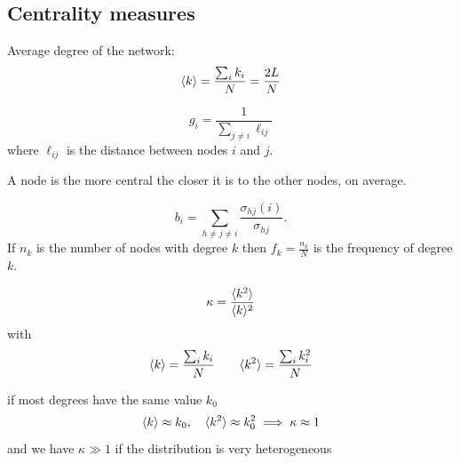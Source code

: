 \documentclass[a4paper,9pt]{extarticle}
\begin{document}
\begin{multicols*}{2}
	\section{Centrality measures}
	Average degree of the network:
	\begin{equation*}
		\langle k \rangle=\frac{\sum_{i}k_{i}}{N}=\frac{2L}{N}
	\end{equation*}
	\begin{riquadro}[Closeness]
		\begin{equation*}
			g_{i}=\frac{1}{\sum_{j\neq i}\ell_{ij}}
		\end{equation*}
		where $\ell_{ij}$ is the distance between nodes $i$ and $j$.
	\end{riquadro}
	A node is the more central the closer it is to the other nodes, on average.
		\begin{riquadro}[Betweenness]
		\begin{equation*}
			b_{i}=\sum_{h\neq j\neq i}\frac{\sigma_{hj}(i)}{\sigma_{hj}}.
		\end{equation*}
		If $n_{k}$ is the number of nodes with degree $k$ then $f_{k}=\frac{n_{k}}{N}$ is the frequency of degree $k$.
	\end{riquadro}
	\begin{riquadro}
		\begin{equation*}
			\kappa=\frac{\langle k^{2} \rangle}{\langle k \rangle^{2}}
		\end{equation*}
		with
		\begin{equation*}
			\langle k \rangle=\frac{\sum_{i}k_{i}}{N}\qquad\langle k^{2} \rangle=\frac{\sum_{i}k^{2}_{i}}{N}
		\end{equation*}
		\end{riquadro}
		if most degrees have the same value $k_{0}$
		\begin{equation*}
			\langle k \rangle\approx k_{0},\quad\langle k^{2} \rangle\approx k_{0}^{2}\implies \kappa\approx1
		\end{equation*}
		and we have $\kappa\gg1$ if the distribution is very heterogeneous 

\end{multicols*}
\end{document}
